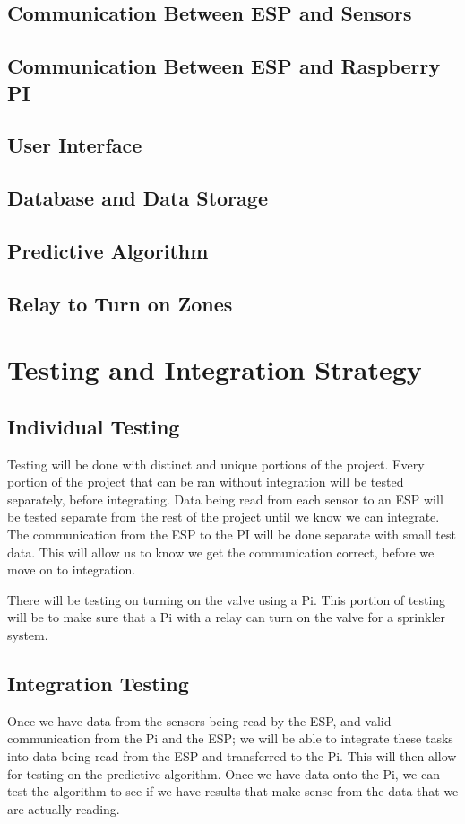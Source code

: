 \documentclass[letterpaper, 10 pt, conference]{ieeeconf}  %
\begin{document}
\subsection{Communication Between ESP and Sensors}

\subsection{Communication Between ESP and Raspberry PI}

\subsection{User Interface}

\subsection{Database and Data Storage}

\subsection{Predictive Algorithm}

\subsection{Relay to Turn on Zones}

\section{Testing and Integration Strategy}
\subsection{Individual Testing}
Testing will be done with distinct and unique portions of the project. Every portion of the project that can be ran without integration will be tested separately, before integrating. Data being read from each sensor to an ESP will be tested separate from the rest of the project until we know we can integrate. The communication from the ESP to the PI will be done separate with small test data. This will allow us to know we get the communication correct, before we move on to integration. 

There will be testing on turning on the valve using a Pi. This portion of testing will be to make sure that a Pi with a relay can turn on the valve for a sprinkler system. 

\subsection{Integration Testing}
Once we have data from the sensors being read by the ESP, and valid communication from the Pi and the ESP; we will be able to integrate these tasks into data being read from the ESP and transferred to the Pi. This will then allow for testing on the predictive algorithm. Once we have data onto the Pi, we can test the algorithm to see if we have results that make sense from the data that we are actually reading. 
\end{document}

